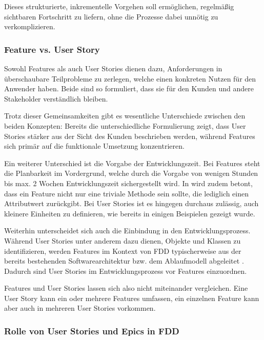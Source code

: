 \documentclass[acmtog]{acmart}
\begin{document}
Dieses strukturierte, inkrementelle Vorgehen soll ermöglichen, regelmäßig sichtbaren Fortschritt zu liefern, ohne die Prozesse dabei unnötig zu verkomplizieren.


\subsubsection{Feature vs. User Story}

Sowohl Features als auch User Stories dienen dazu, Anforderungen in überschaubare Teilprobleme zu zerlegen, welche einen konkreten Nutzen für den Anwender haben. Beide sind so formuliert, dass sie für den Kunden und andere Stakeholder verständlich bleiben.

Trotz dieser Gemeinsamkeiten gibt es wesentliche Unterschiede zwischen den beiden Konzepten:
Bereits die unterschiedliche Formulierung zeigt, dass User Stories stärker aus der Sicht des Kunden beschrieben werden, während Features sich primär auf die funktionale Umsetzung konzentrieren.

Ein weiterer Unterschied ist die Vorgabe der Entwicklungszeit.
Bei Features steht die Planbarkeit im Vordergrund, welche durch die Vorgabe von wenigen Stunden bis max. 2 Wochen Entwicklungszeit sichergestellt wird.
In \cite{palmer02} wird zudem betont, dass ein Feature nicht nur eine triviale Methode sein sollte, die lediglich einen Attributwert zurückgibt.
Bei User Stories ist es hingegen durchaus zulässig, auch kleinere Einheiten zu definieren, wie bereits in einigen Beispielen gezeigt wurde.

Weiterhin unterscheidet sich auch die Einbindung in den Entwicklungsprozess. 
Während User Stories unter anderem dazu dienen, Objekte und Klassen zu identifizieren, werden Features im Kontext von FDD typischerweise aus der bereits bestehenden Softwarearchitektur bzw. dem Ablaufmodell abgeleitet \cite{palmer02}.
Dadurch sind User Stories im Entwicklungsprozess vor Features einzuordnen.

Features und User Stories lassen sich also nicht miteinander vergleichen. Eine User Story kann ein oder mehrere Features umfassen, ein einzelnen Feature kann aber auch in mehreren User Stories vorkommen\cite{coad99}.


\subsubsection{Rolle von User Stories und Epics in FDD}
\end{document}
